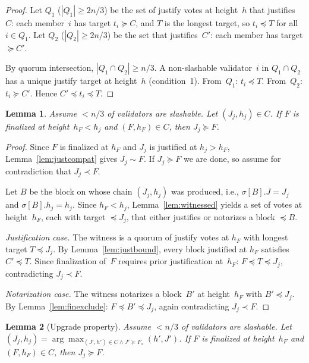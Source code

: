\ifx\litemode\undefined\documentclass{article}\fi
\theoremstyle{plain}
\newtheorem{lemma}{Lemma}
\theoremstyle{definition}
\theoremstyle{remark}
\begin{document}
\begin{proof}
Let $Q_1$ ($|Q_1| \geq 2n/3$) be the set of justify votes at height~$h$ that justifies~$C$: each member~$i$ has target $t_i \succeq C$, and $T$ is the longest target, so $t_i \preceq T$ for all $i \in Q_1$.
Let $Q_2$ ($|Q_2| \geq 2n/3$) be the set that justifies~$C'$: each member has target $\succeq C'$.

By quorum intersection, $|Q_1 \cap Q_2| \geq n/3$.
A non-slashable validator~$i$ in $Q_1 \cap Q_2$ has a unique justify target at height~$h$ (condition~1).
From~$Q_1$: $t_i \preceq T$.
From~$Q_2$: $t_i \succeq C'$.
Hence $C' \preceq t_i \preceq T$.
\end{proof}




\begin{lemma}\label{lem:upgrade-helper}
  Assume $< n/3$ of validators are slashable.
  Let $(J_j, h_j) \in C$.
  If $F$ is finalized at height~$h_F < h_j$ and $(F, h_F) \in C$, then $J_j \succeq F$.
\end{lemma}

\begin{proof}
Since $F$ is finalized at $h_F$ and $J_j$ is justified at $h_j > h_F$, Lemma~\ref{lem:justcompat} gives $J_j \sim F$.
If $J_j \succeq F$ we are done, so assume for contradiction that $J_j \prec F$.

Let $B$ be the block on whose chain $(J_j, h_j)$ was produced, i.e., $\sigma[B].J = J_j$ and $\sigma[B].h_j = h_j$.
Since $h_F < h_j$, Lemma~\ref{lem:witnessed} yields a set of votes at height~$h_F$, each with target $\preceq J_j$, that either justifies or notarizes a block $\preceq B$.

\emph{Justification case.}
The witness is a quorum of justify votes at $h_F$ with longest target $T \preceq J_j$.
By Lemma~\ref{lem:justbound}, every block justified at $h_F$ satisfies $C' \preceq T$.
Since finalization of~$F$ requires prior justification at~$h_F$: $F \preceq T \preceq J_j$, contradicting $J_j \prec F$.

\emph{Notarization case.}
The witness notarizes a block~$B'$ at height~$h_F$ with $B' \preceq J_j$.
By Lemma~\ref{lem:finexclude}: $F \preceq B' \preceq J_j$, again contradicting $J_j \prec F$.
\end{proof}

\begin{lemma}[Upgrade property]\label{lem:upgrade}
  Assume $< n/3$ of validators are slashable.
  Let $(J_j, h_j) = \arg\max_{(J',h')\in C \land J' \succeq F_s}(h', J')$.
  If $F$ is finalized at height~$h_F$ and $(F, h_F) \in C$, then $J_j \succeq F$.
\end{lemma}
\end{document}

